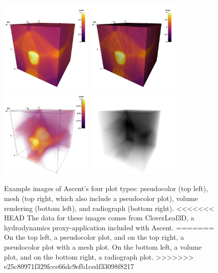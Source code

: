 \begin{figure}
\centering
  \includegraphics[width=0.4\textwidth]{images/pseudocolor250}
  \includegraphics[width=0.4\textwidth]{images/mesh250}
  \includegraphics[width=0.4\textwidth]{images/volume250}
  \includegraphics[width=0.4\textwidth]{images/radiograph250}
  \caption{\label{fig:ascent_plots} Example images of Ascent's four plot types:
pseudocolor (top left), mesh (top right, which also include a pseudocolor plot),
volume rendering (bottom left), and radiograph (bottom right).
%
<<<<<<< HEAD
The data for these images comes from CloverLeaf3D, 
a hydrodynamics proxy-application included with Ascent.
=======
On the top left, a pseudocolor plot, and
on the top right, a pseudocolor plot with a mesh plot.
%
On the bottom left, a volume plot, and
on the bottom right, a radiograph plot.
>>>>>>> e25c80971f329fcce66dc9efb1cedf33098f8217
  }
\end{figure}

